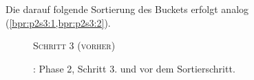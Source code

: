 Die darauf folgende Sortierung des Buckets  erfolgt analog (\cref{bpr:p2s3:1,bpr:p2s3:2}).
\begin{figure}[H]
    {\centering\begin{minipage}{\textwidth}
        {\large \textsc{Schritt 3 (vorher)}}\par\medskip
    \end{minipage}}
    \caption[\bpr: Phase 2, Schritt 3 (vorher)]{\bpr: Phase 2, Schritt 3. \sa und \bptr vor dem Sortierschritt.}
    \label{bpr:p2s3:1}
\end{figure}
